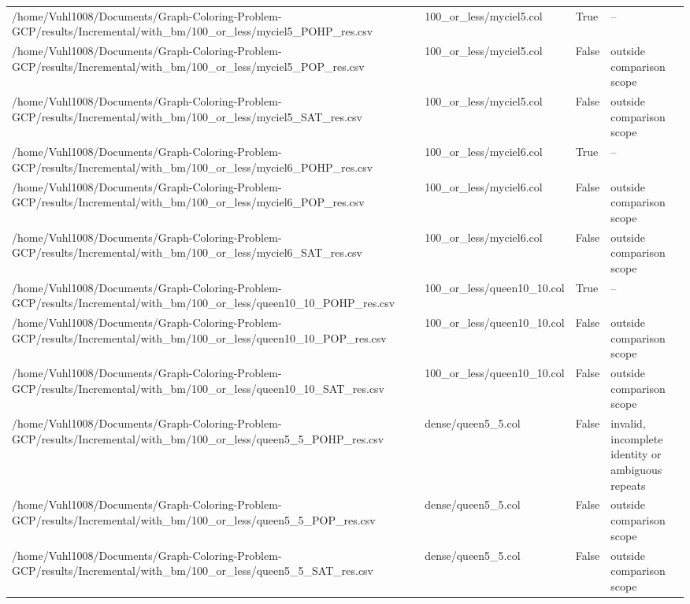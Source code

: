\begin{table}[htbp]
\begin{tabular}{llll}
/home/Vuhl1008/Documents/Graph-Coloring-Problem-GCP/results/Incremental/with\_bm/100\_or\_less/myciel5\_POHP\_res.csv & 100\_or\_less/myciel5.col & True & -- \\
/home/Vuhl1008/Documents/Graph-Coloring-Problem-GCP/results/Incremental/with\_bm/100\_or\_less/myciel5\_POP\_res.csv & 100\_or\_less/myciel5.col & False & outside comparison scope \\
/home/Vuhl1008/Documents/Graph-Coloring-Problem-GCP/results/Incremental/with\_bm/100\_or\_less/myciel5\_SAT\_res.csv & 100\_or\_less/myciel5.col & False & outside comparison scope \\
/home/Vuhl1008/Documents/Graph-Coloring-Problem-GCP/results/Incremental/with\_bm/100\_or\_less/myciel6\_POHP\_res.csv & 100\_or\_less/myciel6.col & True & -- \\
/home/Vuhl1008/Documents/Graph-Coloring-Problem-GCP/results/Incremental/with\_bm/100\_or\_less/myciel6\_POP\_res.csv & 100\_or\_less/myciel6.col & False & outside comparison scope \\
/home/Vuhl1008/Documents/Graph-Coloring-Problem-GCP/results/Incremental/with\_bm/100\_or\_less/myciel6\_SAT\_res.csv & 100\_or\_less/myciel6.col & False & outside comparison scope \\
/home/Vuhl1008/Documents/Graph-Coloring-Problem-GCP/results/Incremental/with\_bm/100\_or\_less/queen10\_10\_POHP\_res.csv & 100\_or\_less/queen10\_10.col & True & -- \\
/home/Vuhl1008/Documents/Graph-Coloring-Problem-GCP/results/Incremental/with\_bm/100\_or\_less/queen10\_10\_POP\_res.csv & 100\_or\_less/queen10\_10.col & False & outside comparison scope \\
/home/Vuhl1008/Documents/Graph-Coloring-Problem-GCP/results/Incremental/with\_bm/100\_or\_less/queen10\_10\_SAT\_res.csv & 100\_or\_less/queen10\_10.col & False & outside comparison scope \\
/home/Vuhl1008/Documents/Graph-Coloring-Problem-GCP/results/Incremental/with\_bm/100\_or\_less/queen5\_5\_POHP\_res.csv & dense/queen5\_5.col & False & invalid, incomplete identity or ambiguous repeats \\
/home/Vuhl1008/Documents/Graph-Coloring-Problem-GCP/results/Incremental/with\_bm/100\_or\_less/queen5\_5\_POP\_res.csv & dense/queen5\_5.col & False & outside comparison scope \\
/home/Vuhl1008/Documents/Graph-Coloring-Problem-GCP/results/Incremental/with\_bm/100\_or\_less/queen5\_5\_SAT\_res.csv & dense/queen5\_5.col & False & outside comparison scope \\

\end{tabular}
\end{table}
